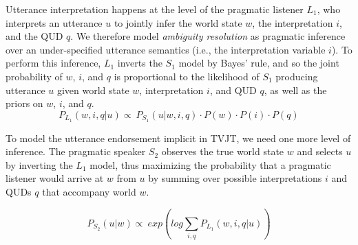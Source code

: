\documentclass[10pt,a4paper]{article}
\newcommand{\gcs}[1]{\textcolor{blue}{[gcs: #1]}}
\newcommand{\lsp}[1]{\textcolor{violet}{[lsp: #1]}}
\newcommand{\kj}[1]{\textcolor{green}{[kj: #1]}}
\begin{document}
Utterance interpretation happens at the level of the pragmatic listener $L_1$, who interprets an utterance $u$ to jointly infer the world state $w$, the interpretation $i$, and the QUD $q$. We therefore model \emph{ambiguity resolution} as pragmatic inference over an under-specified utterance semantics (i.e., the interpretation variable $i$). To perform this inference, $L_1$ inverts the $S_1$ model by Bayes’ rule, 
and so the joint probability of $w$, $i$, and $q$ is proportional  to the  likelihood of $S_1$ producing utterance $u$ given world state $w$, interpretation $i$, and QUD $q$, as well as the priors on $w$, $i$, and $q$.
\begin{equation*}
 P_{L_{1}} (w, i, q | u) \propto  \ P_{S_{1}} (u | w, i, q) \cdot P(w) \cdot P(i) \cdot P(q)
\end{equation*}

To model the utterance endorsement implicit in TVJT, we need one more level of inference. The pragmatic speaker $S_2$ observes the true world state $w$ and selects $u$ by inverting the $L_1$ model, thus maximizing the probability that a pragmatic listener would arrive at $w$ from $u$
by summing over possible interpretations $i$ and QUDs $q$ that accompany world $w$.


\begin{equation*}
P_{S_{2}} (u | w) \propto \ exp(log \sum_{i,q} P_{L_{1}} (w, i, q | u))
\end{equation*}
\end{document}
